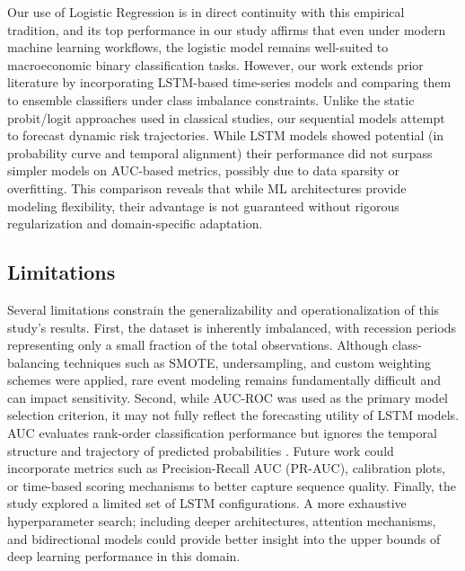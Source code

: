 
Our use of Logistic Regression is in direct continuity with this empirical tradition, and its top performance in our study affirms that even under modern machine learning workflows, the logistic model remains well-suited to macroeconomic binary classification tasks. However, our work extends prior literature by incorporating LSTM-based time-series models and comparing them to ensemble classifiers under class imbalance constraints. Unlike the static probit/logit approaches used in classical studies, our sequential models attempt to forecast dynamic risk trajectories. While LSTM models showed potential (in probability curve and temporal alignment)
their performance did not surpass simpler models on AUC-based metrics, possibly due to data sparsity or overfitting. This comparison reveals that while ML architectures provide modeling flexibility, their advantage is not guaranteed without rigorous regularization and domain-specific adaptation.


\subsection{Limitations}

Several limitations constrain the generalizability and operationalization of this study’s results. First, the dataset is inherently imbalanced, with recession periods representing only a small fraction of the total observations. Although class-balancing techniques such as SMOTE, undersampling, and custom weighting schemes were applied, rare event modeling remains fundamentally difficult and can impact sensitivity. Second, while AUC‐ROC was used as the primary model selection criterion, it may not fully reflect the forecasting utility of LSTM models. AUC evaluates rank-order classification performance but ignores the temporal structure and trajectory of predicted probabilities%
. Future work could incorporate metrics such as Precision-Recall AUC (PR-AUC), calibration plots, or time-based scoring mechanisms to better capture sequence quality. Finally, the study explored a limited set of LSTM configurations. A more exhaustive hyperparameter search; including deeper architectures, attention mechanisms, and bidirectional models could provide better insight into the upper bounds of deep learning performance in this domain.
